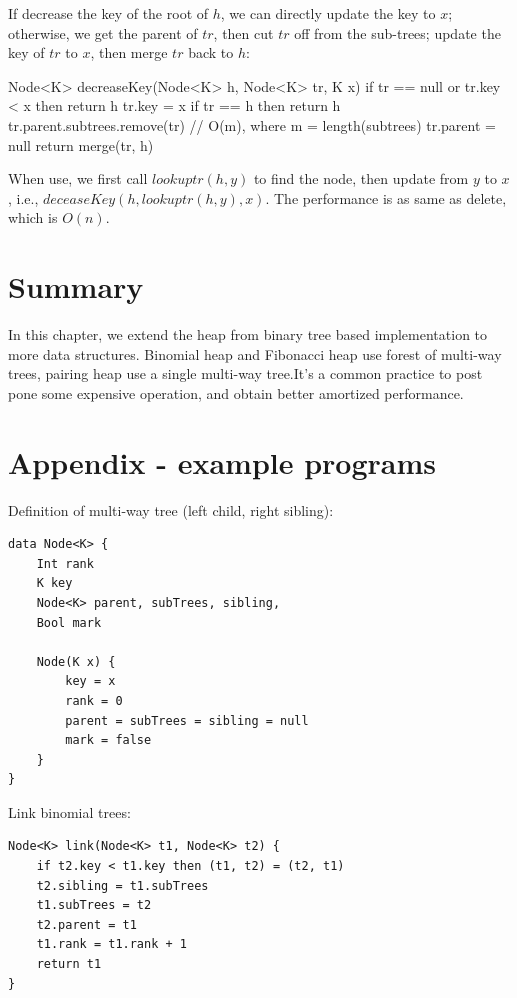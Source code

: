 \documentclass[b5paper]{article}
\begin{document}
\begin{Answer}[ref = {ex:pairing-heap-del}]
{If decrease the key of the root of $h$, we can directly update the key to $x$; otherwise, we get the parent of $tr$, then cut $tr$ off from the sub-trees; update the key of $tr$ to $x$, then merge $tr$ back to $h$:

\begin{Bourbaki}
Node<K> decreaseKey(Node<K> h, Node<K> tr, K x) {
    if tr == null or tr.key < x then return h
    tr.key = x
    if tr == h then return h
    tr.parent.subtrees.remove(tr)  // O(m), where m = length(subtrees)
    tr.parent = null
    return merge(tr, h)
}
\end{Bourbaki}

When use, we first call $lookuptr(h, y)$ to find the node, then update from $y$ to $x$, i.e., $deceaseKey(h, lookuptr(h, y), x)$. The performance is as same as delete, which is $O(n)$.
}
\end{Answer}

\section{Summary}

In this chapter, we extend the heap from binary tree based implementation to more data structures. Binomial heap and Fibonacci heap use forest of multi-way trees, pairing heap use a single multi-way tree.It's a common practice to post pone some expensive operation, and obtain better amortized performance.

\section{Appendix - example programs}

Definition of multi-way tree (left child, right sibling):

\begin{lstlisting}[language = Bourbaki]
data Node<K> {
    Int rank
    K key
    Node<K> parent, subTrees, sibling,
    Bool mark

    Node(K x) {
        key = x
        rank = 0
        parent = subTrees = sibling = null
        mark = false
    }
}
\end{lstlisting}

Link binomial trees:

\begin{lstlisting}[language = Bourbaki]
Node<K> link(Node<K> t1, Node<K> t2) {
    if t2.key < t1.key then (t1, t2) = (t2, t1)
    t2.sibling = t1.subTrees
    t1.subTrees = t2
    t2.parent = t1
    t1.rank = t1.rank + 1
    return t1
}
\end{lstlisting}
\end{document}
